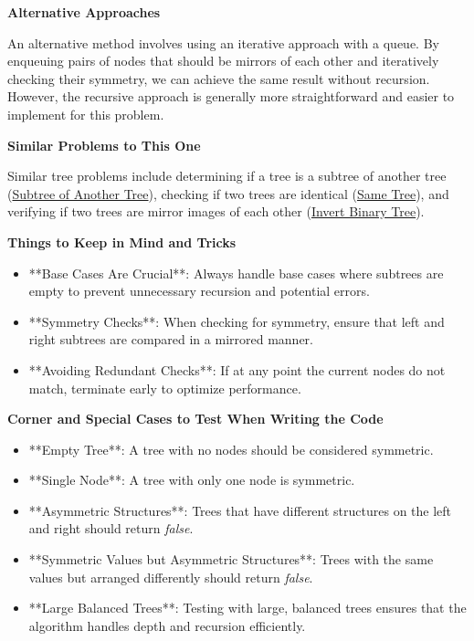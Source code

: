 \textbf{Alternative Approaches}

An alternative method involves using an iterative approach with a queue. By enqueuing pairs of nodes that should be mirrors of each other and iteratively checking their symmetry, we can achieve the same result without recursion. However, the recursive approach is generally more straightforward and easier to implement for this problem.

\textbf{Similar Problems to This One}

Similar tree problems include determining if a tree is a subtree of another tree (\hyperref[problem:subtree_of_another_tree]{Subtree of Another Tree}), checking if two trees are identical (\hyperref[problem:same_tree]{Same Tree}), and verifying if two trees are mirror images of each other (\hyperref[problem:invert_binary_tree]{Invert Binary Tree}).

\textbf{Things to Keep in Mind and Tricks}

\begin{itemize}
    \item **Base Cases Are Crucial**: Always handle base cases where subtrees are empty to prevent unnecessary recursion and potential errors.
    \item **Symmetry Checks**: When checking for symmetry, ensure that left and right subtrees are compared in a mirrored manner.
    \item **Avoiding Redundant Checks**: If at any point the current nodes do not match, terminate early to optimize performance.
\end{itemize}

\textbf{Corner and Special Cases to Test When Writing the Code}

\begin{itemize}
    \item **Empty Tree**: A tree with no nodes should be considered symmetric.
    \item **Single Node**: A tree with only one node is symmetric.
    \item **Asymmetric Structures**: Trees that have different structures on the left and right should return \textit{false}.
    \item **Symmetric Values but Asymmetric Structures**: Trees with the same values but arranged differently should return \textit{false}.
    \item **Large Balanced Trees**: Testing with large, balanced trees ensures that the algorithm handles depth and recursion efficiently.
\end{itemize}